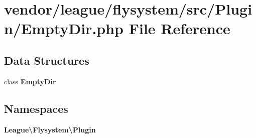 \section{vendor/league/flysystem/src/\+Plugin/\+Empty\+Dir.php File Reference}
\label{_empty_dir_8php}
\subsection*{Data Structures}
\begin{DoxyCompactItemize}
\item 
class {\bf Empty\+Dir}
\end{DoxyCompactItemize}
\subsection*{Namespaces}
\begin{DoxyCompactItemize}
\item 
 {\bf League\textbackslash{}\+Flysystem\textbackslash{}\+Plugin}
\end{DoxyCompactItemize}
